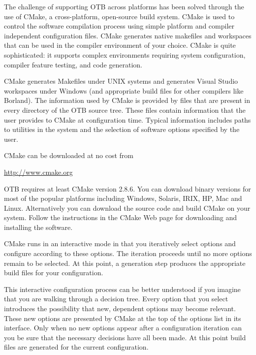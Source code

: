 
The challenge of supporting OTB across platforms has been solved through the use of CMake, a cross-platform, open-source build system. CMake is used to control the software compilation process using simple platform and compiler independent configuration files.  CMake generates native makefiles and workspaces that can be used in the compiler environment of your choice. CMake is quite sophisticated: it supports complex environments requiring system configuration, compiler feature testing, and code generation.

CMake generates Makefiles under UNIX systems and generates Visual Studio workspaces under Windows (and appropriate build files for other compilers like Borland). The information used by CMake is provided by  files that are present in every directory of the OTB source tree. These files contain information that the user provides to CMake at configuration time. Typical information includes paths to utilities in the system and the selection of software options specified by the user.


CMake can be downloaded at no cost from
\begin{center}
  \url{http://www.cmake.org}
\end{center}

OTB requires at least CMake version 2.8.6. You can download binary versions for most of the popular platforms including Windows, Solaris, IRIX, HP, Mac and Linux. 
Alternatively you can download the source code and build CMake on your system. Follow the instructions in the CMake Web page for downloading and installing the software.

CMake runs in an interactive mode in that you iteratively select
options and configure according to these options. The iteration
proceeds until no more options remain to be selected. At this point, a
generation step produces the appropriate build files for your
configuration.

This interactive configuration process can be better understood if you
imagine that you are walking through a decision tree.  Every option that you
select introduces the possibility that new, dependent options may become
relevant. These new options are presented by CMake at the top of the options
list in its interface.  Only when no new options appear after a configuration
iteration can you be sure that the necessary decisions have all been made. At
this point build files are generated for the current configuration.

